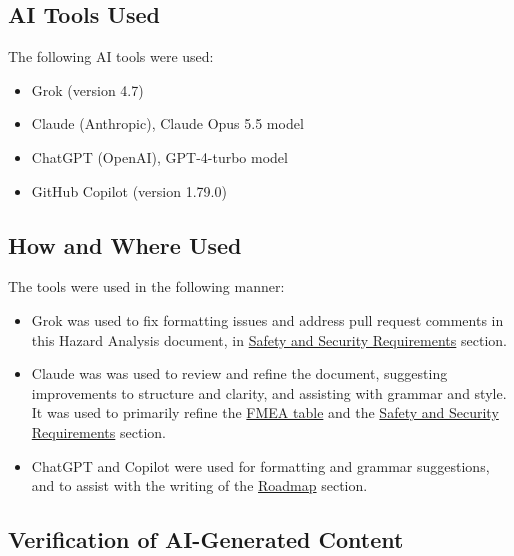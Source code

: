 \documentclass{article}
\begin{document}

\subsection{AI Tools Used}

The following AI tools were used:
\begin{itemize}
    \item Grok (version 4.7)
    \item Claude (Anthropic), Claude Opus 5.5 model
    \item ChatGPT (OpenAI), GPT-4-turbo model
    \item GitHub Copilot (version 1.79.0)
\end{itemize}
\subsection{How and Where Used}

The tools were used in the following manner:
\begin{itemize}
    \item Grok was used to fix formatting issues and address pull request comments in this Hazard Analysis document, in \hyperref[sec_SSR]{Safety and Security
    Requirements} section.
    \item Claude was was used to review and refine the document, suggesting
    improvements to structure and clarity, and assisting with grammar and style. It
    was used to primarily refine the \hyperref[TblFMEA]{FMEA table} and the \hyperref[sec_SSR]{Safety and Security
    Requirements} section.
    \item ChatGPT and Copilot were used for formatting and grammar suggestions, and to assist with the writing of the \hyperref[sec_Roadmap]{Roadmap} section.
\end{itemize}

\subsection{Verification of AI-Generated Content}
\end{document}
